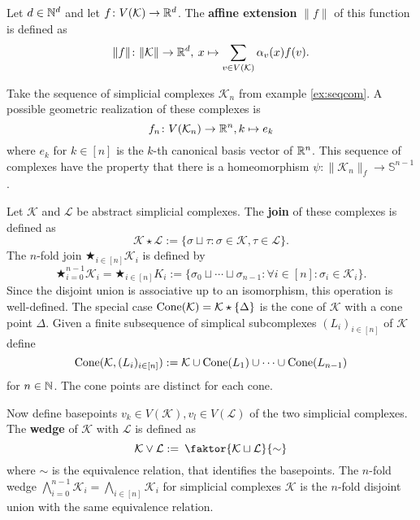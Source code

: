\begin{defin}
  Let $d \in \mathbb{N}^d$ and let $f\colon V(\mathcal{K}) \to \mathbb{R}^d$. The \textbf{affine extension} $\lVert f \rVert$ of this function is defined as
  \begin{equation*}
    \lVert f \rVert\colon \lVert \mathcal{K} \rVert \to \mathbb{R}^d,\: x \mapsto \sum\limits_{v \in V(\mathcal{K})} \alpha_v(x) f(v).
  \end{equation*}
\end{defin}

\begin{ex}
  Take the sequence of simplicial complexes $\mathcal{K}_n$ from example \ref{ex:seqcom}. A possible geometric realization of these complexes is
  \begin{equation*}
    f_n\colon V(\mathcal{K}_n) \to \mathbb{R}^n, k \mapsto e_k 
  \end{equation*}
  where $e_k$ for $k \in [n]$ is the $k$-th canonical basis vector of $\mathbb{R}^n$. This sequence of complexes have the property that there is a homeomorphism $\psi\colon \lVert \mathcal{K}_n \rVert_f \to \mathbb{S}^{n-1}$.
\end{ex}

\begin{defin}
  Let $\mathcal{K}$ and $\mathcal{L}$ be abstract simplicial complexes. The \textbf{join} of these complexes is defined as
  \begin{equation*}
    \mathcal{K} \star \mathcal{L} := \{\sigma \sqcup \tau\colon \sigma \in \mathcal{K}, \tau \in \mathcal{L} \}.
  \end{equation*}
  The $n$-fold join $\bigstar_{i \in [n]} \mathcal{K}_i$ is defined by
  \begin{equation*}
    \bigstar_{i=0}^{n-1} \mathcal{K}_i = \bigstar_{i \in [n]} K_i := \{\sigma_0 \sqcup \cdots \sqcup \sigma_{n-1}\colon \forall i\in [n]\colon \sigma_i \in \mathcal{K}_i\}.
  \end{equation*}
  Since the disjoint union is associative up to an isomorphism, this operation is well-defined.
  The special case ${\rm Cone}(\mathcal{K}) = \mathcal{K} \star \{ \Delta \}$ is the cone of $\mathcal{K}$ with a cone point $\Delta$. Given a finite subsequence of simplical subcomplexes $(L_i)_{i\in [n]}$ of $\mathcal{K}$ define \[{\rm Cone}(\mathcal{K}, (L_i)_{i\in [n]}) := \mathcal{K} \cup {\rm Cone}(L_1) \cup \cdots \cup {\rm Cone}(L_{n-1})\] for $n \in \mathbb{N}$. The cone points are distinct for each cone.

  
  Now define basepoints $v_k \in V(\mathcal{K}), v_l \in V(\mathcal{L})$ of the two simplicial complexes. The \textbf{wedge} of $\mathcal{K}$ with $\mathcal{L}$ is defined as
  \begin{equation*}
    \mathcal{K} \lor \mathcal{L} := \: \faktor{\mathcal{K} \sqcup \mathcal{L}}{\sim}
  \end{equation*}
  where $\sim$ is the equivalence relation, that identifies the basepoints.
  The $n$-fold wedge $\bigwedge_{i=0}^{n-1} \mathcal{K}_i= \bigwedge\limits_{i \in [n]} \mathcal{K}_i$ for simplicial complexes $\mathcal{K}$ is the $n$-fold disjoint union with the same equivalence relation.
\end{defin}

